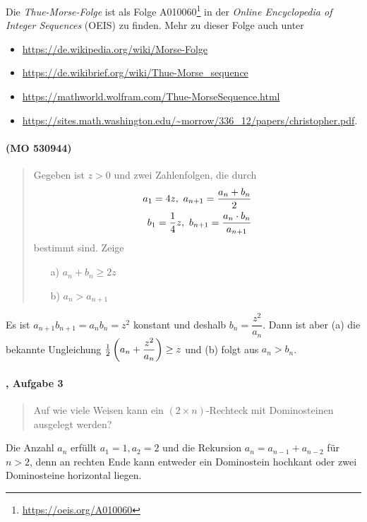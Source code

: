 \documentclass[11pt,a4paper]{article}
\begin{document}
Die \emph{Thue-Morse-Folge} ist als Folge
A010060\footnote{\url{https://oeis.org/A010060}} in der \emph{Online
Encyclopedia of Integer Sequences} (OEIS) zu finden. Mehr zu dieser Folge auch
unter
\begin{itemize}
\item \url{https://de.wikipedia.org/wiki/Morse-Folge}
\item \url{https://de.wikibrief.org/wiki/Thue-Morse_sequence}
\item \url{https://mathworld.wolfram.com/Thue-MorseSequence.html}
\item 
  \url{https://sites.math.washington.edu/~morrow/336_12/papers/christopher.pdf}.
\end{itemize}

\paragraph{(MO 530944)}
\begin{quote}
  Gegeben ist $z>0$ und zwei Zahlenfolgen, die durch
  \begin{align*}
    a_1=4z,\ a_{n+1}=\frac{a_n+b_n}{2}\\
    b_1=\frac14z,\ b_{n+1}=\frac{a_n\cdot b_n}{a_{n+1}}
  \end{align*}
  bestimmt sind. Zeige
  \begin{itemize}
  \item [a)] $a_n+b_n\ge 2z$
  \item [b)] $a_n>a_{n+1}$
  \end{itemize}
\end{quote}
\begin{loesung}
  Es ist $a_{n+1}b_{n+1}=a_nb_n=z^2$ konstant und deshalb
  $b_n=\dfrac{z^2}{a_n}$.  Dann ist aber (a) die bekannte Ungleichung
  $\frac12\left(a_n+\dfrac{z^2}{a_n}\right)\ge z$ und (b) folgt aus $a_n>b_n$. 
\end{loesung}

\paragraph{\cite{S}, Aufgabe 3}
\begin{quote}
  Auf wie viele Weisen kann ein $(2\times n)$-Rechteck mit Dominosteinen
  ausgelegt werden? 
\end{quote}
\begin{loesung}
  Die Anzahl $a_n$ erfüllt $a_1=1, a_2=2$ und die Rekursion
  $a_n=a_{n-1}+a_{n-2}$ für $n>2$, denn an rechten Ende kann entweder ein
  Dominostein hochkant oder zwei Dominosteine horizontal liegen. 
\end{loesung}
\end{document}
